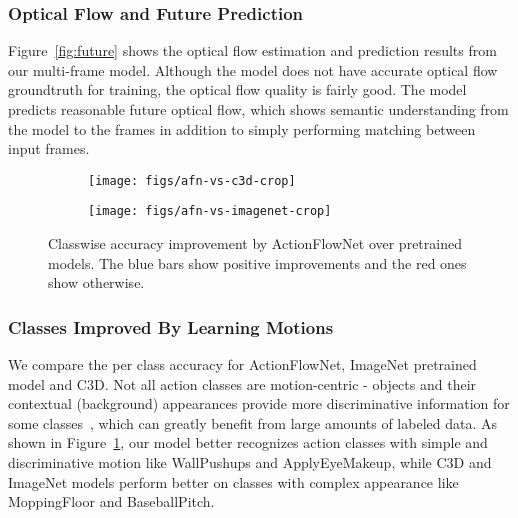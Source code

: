 \documentclass[10pt,twocolumn,letterpaper]{article}
\begin{document}
\vspace{-.5em}\subsubsection{Optical Flow and Future Prediction}\vspace{-.5em}
Figure~\ref{fig:future} shows the optical flow estimation and prediction results from our multi-frame model.
Although the model does not have accurate optical flow groundtruth for training, the optical flow quality is fairly good.
The model predicts reasonable future optical flow, which shows semantic understanding from the model to the frames in addition to simply performing matching between input frames.
\begin{figure}[h!]
\centering
  \begin{subfigure}[ht]{\linewidth}
	\texttt{[image: figs/afn-vs-c3d-crop]}
    \vspace{-1.2em}
  \end{subfigure}
  \begin{subfigure}[ht]{\linewidth}
	\texttt{[image: figs/afn-vs-imagenet-crop]}
  \end{subfigure}
  \vspace{-.5em}
    \caption{Classwise accuracy improvement by ActionFlowNet over pretrained models. The blue bars show positive improvements and the red ones show otherwise.}
	\label{fig:class_wise_improvement}
  \vspace{-1.5em}
\end{figure}\subsubsection{Classes Improved By Learning Motions}\vspace{-.5em}
We compare the per class accuracy for ActionFlowNet, ImageNet pretrained model and C3D.
Not all action classes are motion-centric - objects and their contextual (background) appearances provide more discriminative information for some classes~\cite{jain2015what}, which can greatly benefit from large amounts of labeled data.
As shown in Figure~\ref{fig:class_wise_improvement}, our model better recognizes action classes with simple and discriminative motion like WallPushups and ApplyEyeMakeup, while C3D and ImageNet models perform better on classes with complex appearance like MoppingFloor and BaseballPitch.
\end{document}
